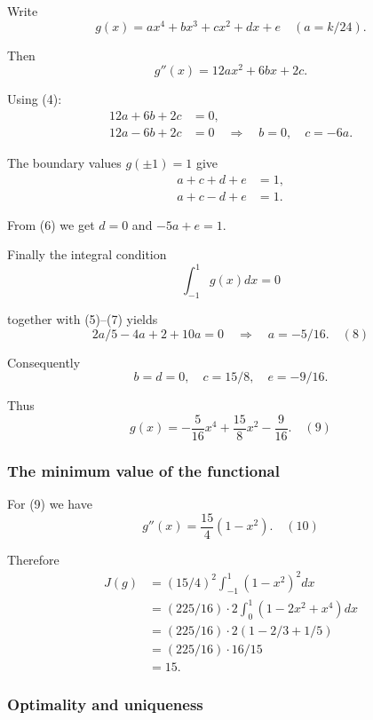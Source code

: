 \documentclass[12pt,a4paper]{article}
\theoremstyle{definition}
\begin{document}
        Write
        $$g(x) = ax^4 + bx^3 + cx^2 + dx + e \quad (a = k/24).$$

        Then
        $$g''(x) = 12ax^2 + 6bx + 2c.$$

        Using (4):
        \begin{align}
            12a + 6b + 2c &= 0, \\
            12a - 6b + 2c &= 0 \quad \Rightarrow \quad b = 0, \quad c = -6a. \tag{5}
        \end{align}

        The boundary values $g(\pm 1) = 1$ give
        \begin{align}
            a + c + d + e &= 1, \\
            a + c - d + e &= 1. \tag{6}
        \end{align}

        From (6) we get $d = 0$ and $-5a + e = 1$. 

        Finally the integral condition
        $$\int_{-1}^{1} g(x)dx = 0$$

        together with (5)--(7) yields
        $$2a/5 - 4a + 2 + 10a = 0 \quad \Rightarrow \quad a = -5/16. \quad {(8)}$$

        Consequently
        $$b = d = 0, \quad c = 15/8, \quad e = -9/16.$$

        Thus
        $$g(x) = -\frac{5}{16}x^4 + \frac{15}{8}x^2 - \frac{9}{16}. \quad {(9)}$$

        \subsubsection*{The minimum value of the functional}

        For (9) we have
        $$g''(x) = \frac{15}{4}(1-x^2). \quad {(10)}$$

        Therefore
        \begin{align}
            J(g) &= (15/4)^2 \int_{-1}^{1}(1-x^2)^2 dx \\
            &= (225/16) \cdot 2\int_{0}^{1}(1-2x^2+x^4)dx \\
            &= (225/16) \cdot 2(1 - 2/3 + 1/5) \\
            &= (225/16) \cdot 16/15 \\
            &= 15. \tag{11}
        \end{align}

        \subsubsection*{Optimality and uniqueness}
\end{document}
